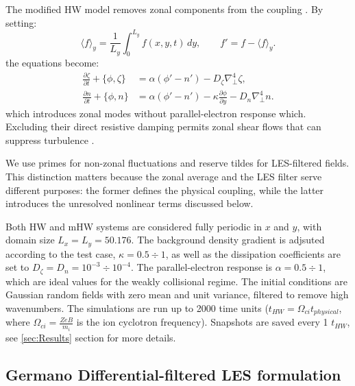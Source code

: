 \documentclass[authoryear,preprint,review,12pt]{elsarticle}
\begin{document}
The modified HW model removes zonal components from the coupling \citep{numata_bifurcation_2007}.
By setting:
\begin{equation}
    \langle f\rangle_y=\frac{1}{L_y}\int_0^{L_y}f(x,y,t)\,dy,
    \qquad f'=f-\langle f\rangle_y.
    \label{eq:zonal_decomposition}
\end{equation}
the equations become:
\begin{align}
    \frac{\partial\zeta}{\partial t}+\{\phi,\zeta\}
    &=\alpha(\phi'-n')-D_\zeta\nabla_\perp^4\zeta,
    \label{eq:mhw_vorticity}\\
    \frac{\partial n}{\partial t}+\{\phi,n\}
    &=\alpha(\phi'-n')-\kappa\frac{\partial\phi}{\partial y}
      -D_n\nabla_\perp^4 n.
    \label{eq:mhw_density}
\end{align}
which introduces zonal modes without parallel-electron response which. Excluding their direct resistive damping permits zonal shear flows that can suppress turbulence \citep{numata_bifurcation_2007}.

We use primes for non-zonal fluctuations and reserve tildes for LES-filtered fields. This distinction matters because the zonal average and the LES filter serve different purposes: the former defines the physical coupling, while the latter introduces the unresolved nonlinear terms discussed below.

Both HW and mHW systems are considered fully periodic in $x$ and $y$, with domain size $L_x=L_y=50.176$. The background density gradient is adjsuted according to the test case, $\kappa=0.5 \div 1$, as well as the dissipation coefficients are set to $D_\zeta=D_n=10^{-3} \div 10^{-4}$. The parallel-electron response is $\alpha=0.5 \div 1$, which are ideal values for the weakly collisional regime. The initial conditions are Gaussian random fields with zero mean and unit variance, filtered to remove high wavenumbers. The simulations are run up to 2000 time units ($t_{HW}=\Omega_{ci}t_{physical}$, where $\Omega_{ci}=\frac{ZeB}{m_i}$ is the ion cyclotron frequency). Snapshots are saved every 1 $t_{HW}$, see \ref{sec:Results} section for more details.

\subsection{Germano Differential-filtered LES formulation}\label{sec:GermanoDifferentialFilter}
\end{document}
